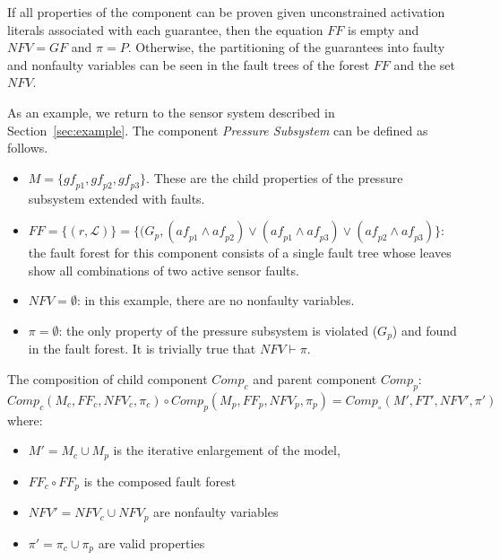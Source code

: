 If all properties of the component can be proven given unconstrained activation literals associated with each guarantee, then the equation $\mathit{FF}$ is empty and $\mathit{NFV} = \mathit{GF}$ and $\pi = P$. Otherwise, the partitioning of the guarantees into faulty and nonfaulty variables can be seen in the fault trees of the forest $\mathit{FF}$ and the set $\mathit{NFV}$. 


As an example, we return to the sensor system described in Section~\ref{sec:example}. The component {\em Pressure Subsystem} can be defined as follows. 

\begin{itemize}[label=\textbullet]
\item $M = \{\mathit{gf}_{p1}, \mathit{gf}_{p2}, \mathit{gf}_{p3}\}$. These are the child properties of the pressure subsystem extended with faults. 
\item $\mathit{FF} = \{(r, \mathcal{L})\} = \{(G_p, (\mathit{af}_{p1} \land \mathit{af}_{p2}) \lor (\mathit{af}_{p1} \land \mathit{af}_{p3}) \lor (\mathit{af}_{p2} \land \mathit{af}_{p3}) \}$: the fault forest for this component consists of a single fault tree whose leaves show all combinations of two active sensor faults.
\item $\mathit{NFV} = \emptyset$: in this example, there are no nonfaulty variables.
\item $\pi = \emptyset$: the only property of the pressure subsystem is violated ($G_p$) and found in the fault forest. It is trivially true that $NFV \vdash \pi$.
\end{itemize}


\begin{definition}
The composition of child component $\mathit{Comp}_c$ and parent component $\mathit{Comp}_p$:
$Comp_c(M_c, \mathit{FF}_c, \mathit{NFV}_c, \pi_c) \circ Comp_p(M_p, \mathit{FF}_p, \mathit{NFV}_p, \pi_p) = Comp_\circ(M', \mathit{FT}', \mathit{NFV}', \pi')$ where:
\begin{itemize}[label=\textbullet]
\item $M' = M_c \cup M_p$ is the iterative enlargement of the model,
\item $\mathit{FF}_c \circ \mathit{FF}_p$ is the composed fault forest
\item $\mathit{NFV}' = \mathit{NFV}_c \cup \mathit{NFV}_p$ are nonfaulty variables
\item $\pi' = \pi_c \cup \pi_p$ are valid properties
\end{itemize}
\end{definition}


